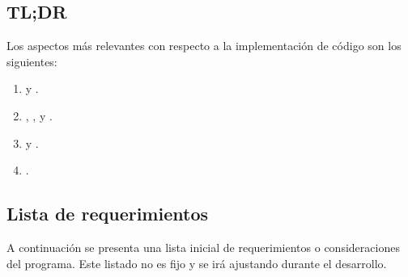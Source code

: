 \subsection*{TL;DR}
\noindent Los aspectos más relevantes con respecto a la implementación de
código son los siguientes:

\begin{enumerate}
\item {} y .

\item {}, ,  y .

\item {} y .

\item {}.
\end{enumerate}

\subsection{Lista de requerimientos}\label{intro:lista-de-requerimientos}
A continuación se presenta una lista inicial de requerimientos o
consideraciones del programa. Este listado no es fijo y se irá ajustando
durante el desarrollo.

